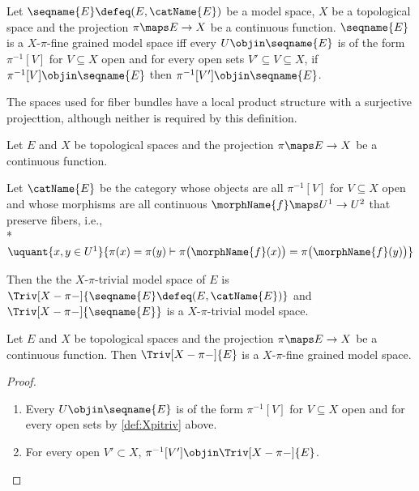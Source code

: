 \documentclass{article}
\begin{document}
\begin{definition}
\label{def:Xpimod}
Let $\seqname{E} \defeq (E,\catName{E})$ be a model space, $X$ be a
topological space and the projection $\pi \maps E \to X$ be a continuous
function. $\seqname{E}$ is a $X$-$\pi$-fine grained model space iff
every $U \objin \seqname{E}$ is of the form $\pi^{-1}[V]$ for
$V \subseteq X$ open and for every open sets
$V' \subseteq V \subseteq X$, if $\pi^{-1}[V] \objin \seqname{E}$ then
$\pi^{-1}[V'] \objin \seqname{E}$.

\begin{remark}
The spaces used for fiber bundles have a local product structure with a
surjective projecttion, although neither is required by this definition.
\end{remark}
\end{definition}

\begin{definition}
\label{def:Xpitriv}
Let $E$ and $X$ be topological spaces and the projection
$\pi \maps E \to X$ be a continuous function.

Let $\catName{E}$ be the category whose objects are all $\pi^{-1}[V]$
for $V \subseteq X$ open and whose morphisms are all continuous
$\morphName{f} \maps U^1 \to U^2$ that preserve fibers, i.e., \\*
$
  \uquant
    {{x,y \in U^1}}
    {{
      \pi(x) = \pi(y) \vdash
      \pi \bigl ( \morphName{f}(x) \bigr ) =
      \pi \bigl ( \morphName{f}(y) \bigr )
    }}
$

Then the the $X$-$\pi$-trivial model space of $E$ is
$\Triv[X-\pi-]{\seqname{E} \defeq (E,\catName{E})}$ and
$\Triv[X-\pi-]{\seqname{E}}$ is a $X$-$\pi$-trivial model space.
\end{definition}

\begin{lemma}
\label{lem:Xpitriv}
Let $E$ and $X$ be topological spaces and the projection
$\pi \maps E \to X$ be a continuous function. Then
$\Triv[X-\pi-]{E}$ is a $X$-$\pi$-fine grained model space.

\begin{proof}
\begin{enumerate}
\item
Every $U \objin \seqname{E}$ is of the form $\pi^{-1}[V]$ for
$V \subseteq X$ open and for every open sets by \cref{def:Xpitriv}
above.

\item
For every open $V' \subset X$, $\pi^{-1}[V'] \objin \Triv[X-\pi-]{E}$.
\end{enumerate}
\end{proof}

\end{lemma}
\end{document}
